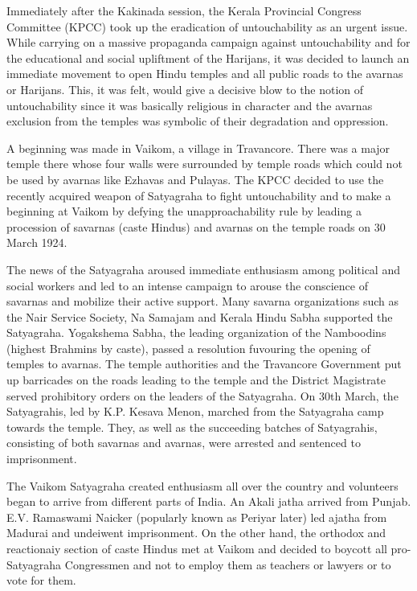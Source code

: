 \begin{multicols}{2}
Immediately after the Kakinada session, the Kerala Provincial Congress Committee (KPCC) took up the eradication of untouchability as an urgent issue. While carrying on a massive propaganda campaign against untouchability and for the educational and social upliftment of the Harijans, it was decided to launch an immediate movement to open Hindu temples and all public roads to the avarnas or Harijans. This, it was felt, would give a decisive blow to the notion of untouchability since it was basically religious in character and the avarnas exclusion from the temples was symbolic of their degradation and oppression.

A beginning was made in Vaikom, a village in Travancore. There was a major temple there whose four walls were surrounded by temple roads which could not be used by avarnas like Ezhavas and Pulayas. The KPCC decided to use the recently acquired weapon of Satyagraha to fight untouchability and to make a beginning at Vaikom by defying the unapproachability rule by leading a procession of savarnas (caste Hindus) and avarnas on the temple roads on 30 March 1924.

The news of the Satyagraha aroused immediate enthusiasm among political and social workers and led to an intense campaign to arouse the conscience of savarnas and mobilize their active support. Many savarna organizations such as the Nair Service Society, Na Samajam and Kerala Hindu Sabha supported the Satyagraha. Yogakshema Sabha, the leading organization of the Namboodins (highest Brahmins by caste), passed a resolution fuvouring the opening of temples to avarnas. The temple authorities and the Travancore Government put up barricades on the roads leading to the temple and the District Magistrate served prohibitory orders on the leaders of the Satyagraha. On 30th March, the Satyagrahis, led by K.P. Kesava Menon, marched from the Satyagraha camp towards the temple. They, as well as the succeeding batches of Satyagrahis, consisting of both savarnas and avarnas, were arrested and sentenced to imprisonment.

The Vaikom Satyagraha created enthusiasm all over the country and volunteers began to arrive from different parts of India. An Akali jatha arrived from Punjab. E.V. Ramaswami Naicker (popularly known as Periyar later) led ajatha from Madurai and undeiwent imprisonment. On the other hand, the orthodox and reactionaiy section of caste Hindus met at Vaikom and decided to boycott all pro-Satyagraha Congressmen and not to employ them as teachers or lawyers or to vote for them.


\end{multicols}
